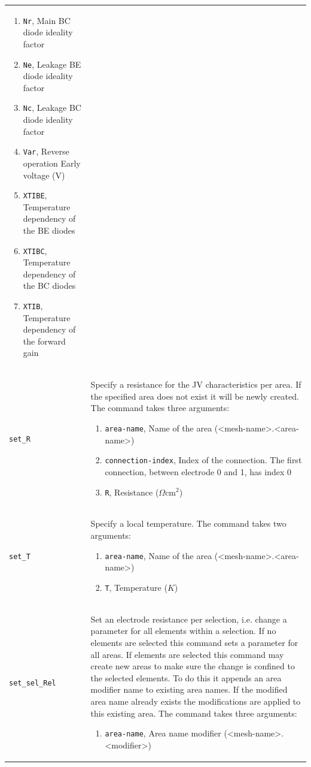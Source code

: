 \documentclass[noshowpacs,preprintnumbers,amsmath,amssymb, letter]{revtex4}
\begin{document}
\begin{longtable}{p{}p{}}
\begin{enumerate}
\item \texttt{Nr},  Main BC diode ideality factor 
\item \texttt{Ne},  Leakage BE diode ideality factor 
\item \texttt{Nc},  Leakage BC diode ideality factor
\item \texttt{Var},  Reverse operation Early voltage (V)
\item \texttt{XTIBE},  Temperature dependency of the BE diodes 
\item \texttt{XTIBC},  Temperature dependency of the BC diodes 
\item \texttt{XTIB},  Temperature dependency of the forward gain 
\end{enumerate}\\
\texttt{set\_R}	&  Specify a resistance for the JV characteristics per area. If the specified area does not exist it will be newly created. The command takes three arguments:
\begin{enumerate}
\item \texttt{area-name}, Name of the area (\textless mesh-name\textgreater .\textless area-name\textgreater )
\item \texttt{connection-index}, Index of the connection. The first connection, between electrode 0 and 1,  has index 0
\item \texttt{R}, Resistance ($\Omega \text{cm}^2$)
\end{enumerate}\\
\texttt{set\_T}	&  Specify a local temperature. The command takes two arguments:
\begin{enumerate}
\item \texttt{area-name}, Name of the area (\textless mesh-name\textgreater .\textless area-name\textgreater )
\item \texttt{T}, Temperature ($K$)
\end{enumerate}\\
\texttt{set\_sel\_Rel}	&  Set an electrode resistance per selection, i.e. change a parameter for all elements within a selection. If no elements are selected this command sets a parameter for all areas. If elements are selected this command may create new areas to make sure the change is confined to the selected elements. To do this it appends an area modifier name to existing area names. If the modified area name already exists the modifications are applied to this existing area. The command takes three arguments:
\begin{enumerate}
\item \texttt{area-name}, Area name modifier (\textless mesh-name\textgreater .\textless modifier\textgreater )

\end{enumerate}
\end{longtable}
\end{document}

